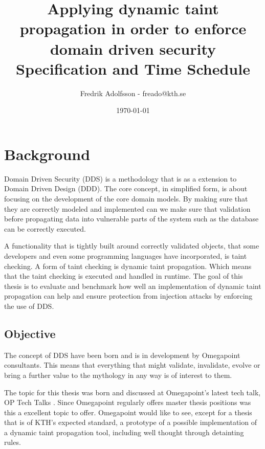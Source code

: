 \documentclass{../kththesis}
\title{Applying dynamic taint propagation in order to enforce domain driven security \\
        \large Specification and Time Schedule}
\author{Fredrik Adolfsson - freado@kth.se}
\date{\today}
\begin{document}
\frontmatter


\titlepage


\tableofcontents


\mainmatter



\chapter{Background}
Domain Driven Security (DDS) is a methodology that is as a extension to Domain Driven Design (DDD). The core concept, in simplified form, is about focusing on the development of the core domain models. By making sure that they are correctly modeled and implemented can we make sure that validation before propagating data into vulnerable parts of the system such as the database can be correctly executed. \parencite{evans_2015, EvansEric2004Dd:t, Wilander2009, Johnsson2009}

A functionality that is tightly built around correctly validated objects, that some developers and even some programming languages have incorporated, is taint checking. \parencite{perl, ruby, Clause2007} A form of taint checking is dynamic taint propagation. Which means that the taint checking is executed and handled in runtime. The goal of this thesis is to evaluate and benchmark how well an implementation of dynamic taint propagation can help and ensure protection from injection attacks by enforcing the use of DDS. 


\section{Objective}
The concept of DDS have been born and is in development by Omegapoint consultants. This means that everything that might validate, invalidate, evolve or bring a further value to the mythology in any way is of interest to them. 

The topic for this thesis was born and discussed at Omegapoint's latest tech talk, OP Tech Talks \parencite{Tardell}. Since Omegapoint regularly offers master thesis positions was this a excellent topic to offer. Omegapoint would like to see, except for a thesis that is of KTH's expected standard, a prototype of a possible implementation of a dynamic taint propagation tool, including well thought through detainting rules.
\end{document}
